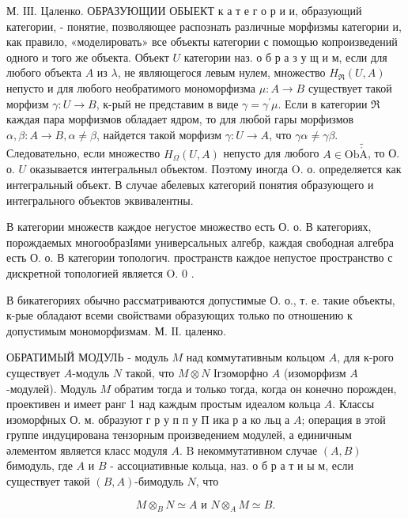 \documentclass[10pt]{article}
\def\AA{\mathring{\mathrm{A}}}
\begin{document}
М. ІІІ. Цаленко. ОБРАЗУЮЩИИ ОБЫЕКТ к а т е г о р и и, образующий категории, - понятие, позволяющее распознать различные морфизмы категории и, как правило, «моделировать» все объекты категории с помощью копроизведений одного и того же объекта. Объект $U$ категории наз. о б р а з у щ и м, если для любого объекта $A$ из $\mathfrak{\lambda}$, не являющегося левым нулем, множество $H_{\Re}(U, A)$ непусто и для любого необратимого мономорфизма $\mu: A \rightarrow B$ существует такой морфизм $\gamma: U \rightarrow B$, к-рый не представим в виде $\gamma=\gamma^{\prime} \mu$. Если в категории $\Re$ каждая пара морфизмов обладает ядром, то для любой гары морфизмов $\alpha, \beta: A \rightarrow B, \alpha \neq \beta$, найдется такой морфизм $\gamma: U \rightarrow A$, что $\gamma \alpha \neq \gamma \beta$. Следовательно, если множество $H_{\Omega}(U, A)$ непусто для любого $A \in \mathrm{Ob} \tilde{\AA}$, то О. о. $U$ оказывается интегральныл объектом. Поэтому иногда $\mathrm{O}$. о. определяется как интегральный объект. В случае абелевых категорий понятия образующего и интегрального объектов эквивалентны.



В категории множеств каждое негустое множество есть О. о. В категориях, порождаемых многообразІями универсальных алгебр, каждая свободная алгебра есть О. о. В категории топологич. пространств каждое непустое пространство с дискретной топологией является O. 0 .



В бикатегориях обычно рассматриваются допустимые О. о., т. е. такие объекты, к-рые обладают всеми свойствами образующих только по отношению к допустимым мономорфизмам. $М$. ІІ. цаленко.



ОБРАТИМЫЙ МОДУЛЬ - модуль $M$ над коммутативным кольцом $A$, для к-рого существует $A$-модуль $N$ такой, что $M \otimes N$ Ігзоморфно $A$ (изоморфизм $A$-модулей). Модуль $M$ обратим тогда и только тогда, когда он конечно порожден, проективен и имеет ранг 1 над каждым простым идеалом кольца $A$. Классы изоморфных О. м. образуют г р у п п у П ика р а ко льц а $A$; операция в этой группе индуцирована тензорным произведением модулей, а единичным әлементом является класс модуля $A$. $\mathrm{B}$ некоммутативном случае $(A, B)$ бимодуль, где $A$ и $B$ - ассоциативные кольца, наз. о б р а т и ы м, если существует такой $(B, A)$-бимодуль $N$, что



\[

M \otimes_{B} N \simeq A \text { и } N \otimes_{A} M \simeq B .

\]
\end{document}
